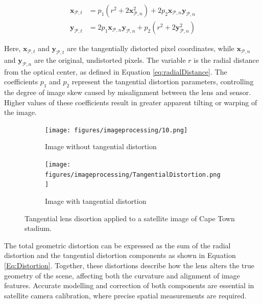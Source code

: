 \begin{equation}
    \begin{split}
    \mathbf{x}_{\mathcal{P},t}  &= p_1(r^2 + 2\mathbf{x}_{\mathcal{P},n} ^2) + 2p_2\mathbf{x}_{\mathcal{P},n} \mathbf{y}_{\mathcal{P},n}  \\
    \mathbf{y}_{\mathcal{P},t}  &= 2p_1\mathbf{x}_{\mathcal{P},n} \mathbf{y}_{\mathcal{P},n}  + p_2(r^2 + 2\mathbf{y}_{\mathcal{P},n} ^2) 
    \end{split}
\end{equation}

\noindent
Here, $\mathbf{x}_{\mathcal{P},t}$ and $\mathbf{y}_{\mathcal{P},t}$ are the tangentially distorted pixel coordinates, while $\mathbf{x}_{\mathcal{P},n}$ and $\mathbf{y}_{\mathcal{P},n}$ are the original, undistorted pixels. 
The variable $r$ is the radial distance from the optical center, as defined in Equation \ref{eq:radialDistance}. 
The coefficients $p_1$ and $p_2$ represent the tangential distortion parameters, controlling the degree of image skew caused by misalignment between the lens and sensor. 
Higher values of these coefficients result in greater apparent tilting or warping of the image.


\begin{figure}[H]
    \centering
    \begin{subfigure}[b]{0.48\linewidth}
        \centering
        \texttt{[image: figures/imageprocessing/10.png]}
        \caption{Image without tangential distortion}
        \label{fig:TD1}
    \end{subfigure}
    \hfill
    \begin{subfigure}[b]{0.48\linewidth}
        \centering
        \texttt{[image: figures/imageprocessing/TangentialDistortion.png]}
        \caption{Image with tangential distortion}
        \label{fig:TD2}
    \end{subfigure}
    \caption{Tangential lens disortion applied to a satellite image of Cape Town stadium.}
    \label{fig:TangentialDisortion}
\end{figure}


\noindent
The total geometric distortion can be expressed as the sum of the radial distortion and the tangential distortion components as shown in Equation \ref{Eq:Distortion}. Together, these
distortions describe how the lens alters the true geometry of the scene, affecting both the curvature and alignment of image features. Accurate modelling and correction of both 
components are essential in satellite camera calibration, where precise spatial measurements are required.


